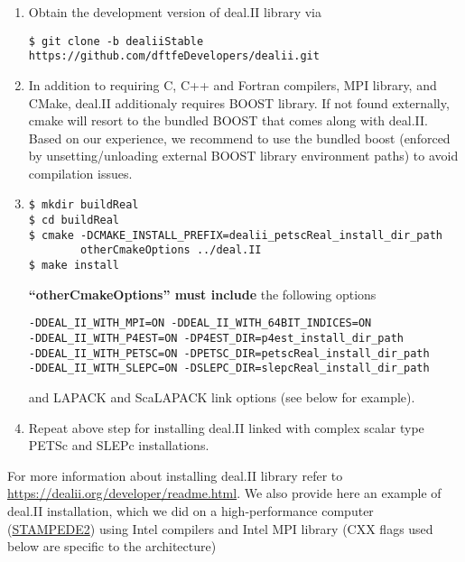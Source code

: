 \begin{enumerate}

\item Obtain the development version of deal.II library via
\begin{verbatim}
$ git clone -b dealiiStable https://github.com/dftfeDevelopers/dealii.git
\end{verbatim}

\item In addition to requiring C, C++ and Fortran compilers, MPI library, and CMake, deal.II additionaly requires BOOST library. If not found externally, cmake will resort to the bundled BOOST that comes along with deal.II. Based on our experience, we recommend to use the bundled boost (enforced by unsetting/unloading external BOOST library environment paths) to avoid compilation issues.

\item
\begin{verbatim}
$ mkdir buildReal
$ cd buildReal
$ cmake -DCMAKE_INSTALL_PREFIX=dealii_petscReal_install_dir_path
        otherCmakeOptions ../deal.II
$ make install
\end{verbatim}
{\bf ``otherCmakeOptions'' must include} the following options
\begin{verbatim}
-DDEAL_II_WITH_MPI=ON -DDEAL_II_WITH_64BIT_INDICES=ON
-DDEAL_II_WITH_P4EST=ON -DP4EST_DIR=p4est_install_dir_path
-DDEAL_II_WITH_PETSC=ON -DPETSC_DIR=petscReal_install_dir_path 
-DDEAL_II_WITH_SLEPC=ON -DSLEPC_DIR=slepcReal_install_dir_path
\end{verbatim}
and LAPACK and ScaLAPACK link options (see below for example). 

\item Repeat above step for installing deal.II linked with complex scalar type PETSc and SLEPc installations. 
\end{enumerate}	
 For more information about installing deal.II library refer to \url{https://dealii.org/developer/readme.html}. We also provide here an example of deal.II installation, which we did on a high-performance computer (\href{https://www.tacc.utexas.edu/systems/stampede2}{STAMPEDE2}) using Intel compilers and Intel MPI library (CXX flags used below are specific to the architecture)
